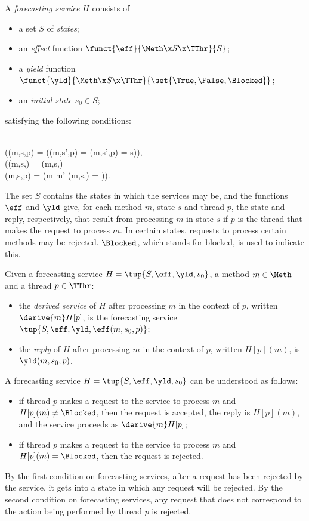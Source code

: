 \documentclass[fleqn]{llncs}
\begin{document}
A \emph{forecasting service} $H$ consists of
\begin{itemize}
\item
a set $S$ of \emph{states};
\item
an \emph{effect} function $\funct{\eff}{\Meth \x S \x \TThr}{S}$;
\item
a \emph{yield} function
$\funct{\yld}{\Meth \x S \x \TThr}{\set{\True,\False,\Blocked}}$;
\item
an \emph{initial state} $s_0 \in S$;
\end{itemize}
satisfying the following conditions:
\begin{ldispl}
 {}
\\ \quad
(\yld(m,s,p) = \Blocked \land
  {(\yld(m,s',p) = \Blocked \limpl \eff(m,s',p) = s)})\;,
\eqnsep
{}
\\ \quad
 (\yld(m,s,\Stop) = \Blocked \land
  \yld(m,s,\DeadEnd) = \Blocked \land {}
\\ \quad \phantom{(}
  \yld(m,s,\Tau \bapf p) = \Blocked \land
  (m \neq m' \limpl
   \yld(m,s,) = \Blocked))\;.
\end{ldispl}The set $S$ contains the states in which the services may be, and the
functions $\eff$ and $\yld$ give, for each method $m$, state $s$ and
thread $p$, the state and reply, respectively, that result from
processing $m$ in state $s$ if $p$ is the thread that makes the request
to process $m$.
In certain states, requests to process certain methods may be rejected.
$\Blocked$, which stands for blocked, is used to indicate this.

Given a forecasting service $H = \tup{S,\eff,\yld,s_0}$, a method
$m \in \Meth$ and a thread $p \in \TThr$:
\begin{itemize}
\item
the \emph{derived service} of $H$ after processing $m$ in the context
of $p$, written $\derive{m}H[p]$, is the forecasting service
$\tup{S,\eff,\yld,\eff(m,s_0,p)}$;
\item
the \emph{reply} of $H$ after processing $m$ in the context of $p$,
written $H[p](m)$, is $\yld(m,s_0,p)$.
\end{itemize}

A forecasting service $H = \tup{S,\eff,\yld,s_0}$ can be understood as
follows:
\begin{itemize}
\item
if thread $p$ makes a request to the service to process $m$ and
$H[p](m) \neq \Blocked$, then the request is accepted, the reply is
$H[p](m)$, and the service proceeds as $\derive{m}H[p]$;
\item
if thread $p$ makes a request to the service to process $m$ and
$H[p](m) = \Blocked$, then the request is rejected.
\end{itemize}
By the first condition on forecasting services, after a request has been
rejected by the service, it gets into a state in which any request will
be rejected.
By the second condition on forecasting services, any request that does
not correspond to the action being performed by thread $p$ is rejected.
\end{document}
